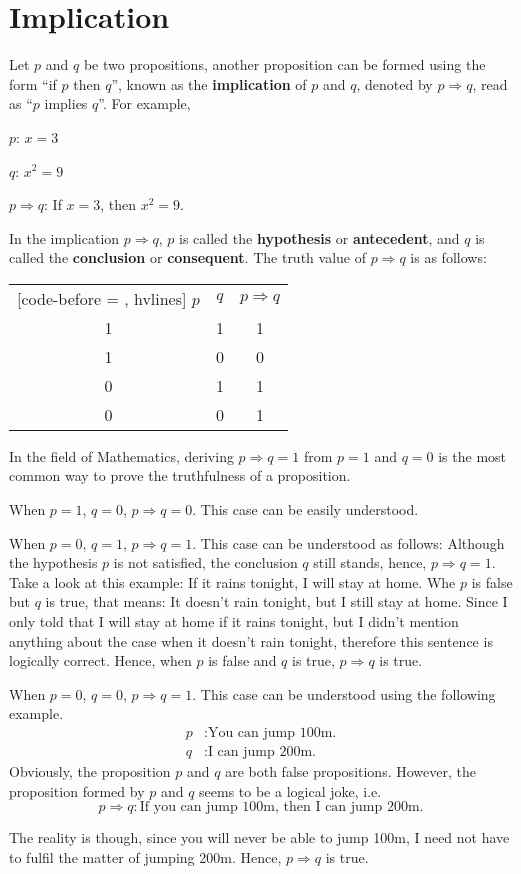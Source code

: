 \documentclass{report}
\newcounter{example}
\begin{document}
\section{Implication}

Let $p$ and $q$ be two propositions, another proposition can be formed using
the form ``if $p$ then $q$'', known as the \textbf{implication} of $p$ and $q$,
denoted by $p \Rightarrow q$, read as ``$p$ implies $q$''. For example,

$p$: $x = 3$

$q$: $x^2 = 9$

$p \Rightarrow q$: If $x = 3$, then $x^2 = 9$.

\noindent In the implication $p \Rightarrow q$, $p$ is called the \textbf{hypothesis} or
\textbf{antecedent}, and $q$ is called the \textbf{conclusion} or
\textbf{consequent}. The truth value of $p \Rightarrow q$ is as follows:
\begin{center}
    \begin{NiceTabular}{|c|c|c|}[code-before = , hvlines]
        $p$ & $q$ & $p \Rightarrow q$ \\
        1   & 1   & 1                 \\
        1   & 0   & 0                 \\
        0   & 1   & 1                 \\
        0   & 0   & 1                 \\
    \end{NiceTabular}
\end{center}

In the field of Mathematics, deriving $p \Rightarrow q = 1$ from $p = 1$ and $q
    = 0$ is the most common way to prove the truthfulness of a proposition.

When $p = 1$, $q = 0$, $p \Rightarrow q = 0$. This case can be easily
understood.

When $p = 0$, $q = 1$, $p \Rightarrow q = 1$. This case can be understood as
follows: Although the hypothesis $p$ is not satisfied, the conclusion $q$ still
stands, hence, $p \Rightarrow q = 1$. Take a look at this example: If it rains
tonight, I will stay at home. Whe $p$ is false but $q$ is true, that means: It
doesn't rain tonight, but I still stay at home. Since I only told that I will
stay at home if it rains tonight, but I didn't mention anything about the case
when it doesn't rain tonight, therefore this sentence is logically correct.
Hence, when $p$ is false and $q$ is true, $p \Rightarrow q$ is true.

When $p = 0$, $q = 0$, $p \Rightarrow q = 1$. This case can be understood using
the following example.
\begin{align*}
    p & : \text{You can jump 100m.} \\
    q & : \text{I can jump 200m.}
\end{align*}
Obviously, the proposition $p$ and $q$ are both false propositions. However, the proposition formed by $p$ and $q$ seems to be a logical joke, i.e.
\[p \Rightarrow q : \text{If you can jump 100m, then I can jump 200m.}\]

The reality is though, since you will never be able to jump 100m, I need not
have to fulfil the matter of jumping 200m. Hence, $p \Rightarrow q$ is true.
\end{document}
